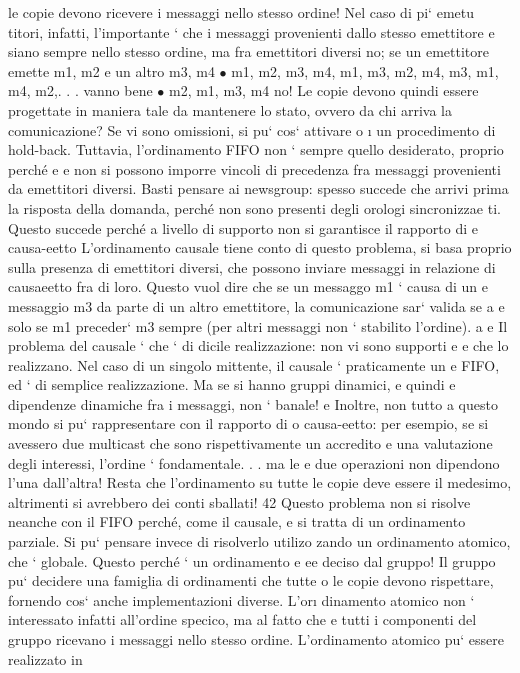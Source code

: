 \documentclass[a4paper,12pt]{article}
\begin{document}
le copie devono ricevere i messaggi nello stesso ordine! Nel caso di pi` emetu
titori, infatti, l'importante ` che i messaggi provenienti dallo stesso emettitore
e
siano sempre nello stesso ordine, ma fra emettitori diversi no; se un emettitore
emette m1, m2 e un altro m3, m4
$\bullet$ m1, m2, m3, m4, m1, m3, m2, m4, m3, m1, m4, m2,. . . vanno bene
$\bullet$ m2, m1, m3, m4 no!
Le copie devono quindi essere progettate in maniera tale da mantenere lo stato,
ovvero da chi arriva la comunicazione? Se vi sono omissioni, si pu` cos` attivare
o
\i{}
un procedimento di hold-back.
Tuttavia, l'ordinamento FIFO non ` sempre quello desiderato, proprio perché
e
e
non si possono imporre vincoli di precedenza fra messaggi provenienti da emettitori diversi. Basti pensare ai newsgroup:
spesso succede che arrivi prima
la risposta della domanda, perché non sono presenti degli orologi sincronizzae
ti. Questo succede perché a livello di supporto non si garantisce il rapporto di
e
causa-eetto
L'ordinamento causale tiene conto di questo problema, si basa proprio sulla
presenza di emettitori diversi, che possono inviare messaggi in relazione di causaeetto fra di loro. Questo vuol dire
che se un messaggo m1 ` causa di un
e
messaggio m3 da parte di un altro emettitore, la comunicazione sar` valida se
a
e solo se m1 preceder` m3 sempre (per altri messaggi non ` stabilito l'ordine).
a
e
Il problema del causale ` che ` di dicile realizzazione: non vi sono supporti
e
e
che lo realizzano. Nel caso di un singolo mittente, il causale ` praticamente un
e
FIFO, ed ` di semplice realizzazione. Ma se si hanno gruppi dinamici, e quindi
e
dipendenze dinamiche fra i messaggi, non ` banale!
e
Inoltre, non tutto a questo mondo si pu` rappresentare con il rapporto di
o
causa-eetto: per esempio, se si avessero due multicast che sono rispettivamente
un accredito e una valutazione degli interessi, l'ordine ` fondamentale. . . ma le
e
due operazioni non dipendono l'una dall'altra! Resta che l'ordinamento su tutte
le copie deve essere il medesimo, altrimenti si avrebbero dei conti sballati!
42
Questo problema non si risolve neanche con il FIFO perché, come il causale,
e
si tratta di un ordinamento parziale. Si pu` pensare invece di risolverlo utilizo
zando un ordinamento atomico, che ` globale. Questo perché ` un ordinamento
e
ee
deciso dal gruppo! Il gruppo pu` decidere una famiglia di ordinamenti che tutte
o
le copie devono rispettare, fornendo cos` anche implementazioni diverse. L'or\i{}
dinamento atomico non ` interessato infatti all'ordine specico, ma al fatto che
e
tutti i componenti del gruppo ricevano i messaggi nello stesso ordine. L'ordinamento atomico pu` essere realizzato in
\end{document}
